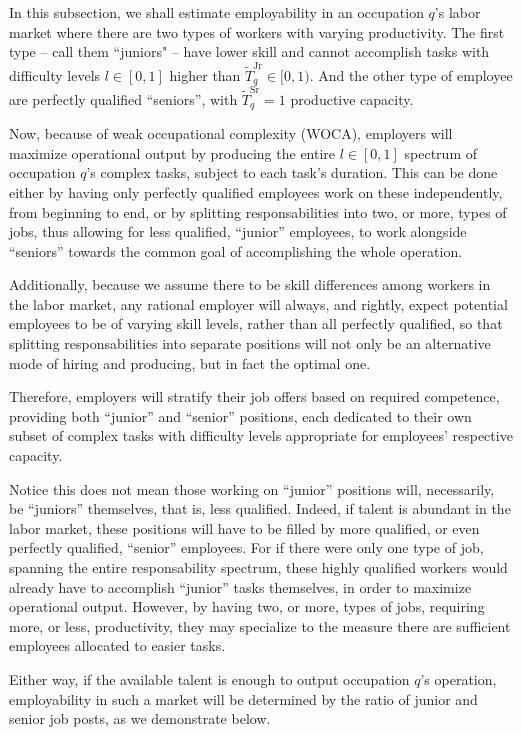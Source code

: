 \documentclass[hidelinks, nonatbib]{elsarticle}
\begin{document}
In this subsection, we shall estimate employability in an occupation $q$'s labor market where there are two types of workers with varying productivity. The first type -- call them ``juniors" -- have lower skill and cannot accomplish tasks with difficulty levels $l \in [0,1]$ higher than $\tilde{T}_{q}^{\text{Jr}} \in [0,1)$. And the other type of employee are perfectly qualified ``seniors'', with $\tilde{T}_{q}^{\text{Sr}} = 1$ productive capacity.

Now, because of weak occupational complexity (WOCA), employers will maximize operational output by producing the entire $l \in [0,1]$ spectrum of occupation $q$'s complex tasks, subject to each task's duration. This can be done either by having only perfectly qualified employees work on these independently, from beginning to end, or by splitting responsabilities into two, or more, types of jobs, thus allowing for less qualified, ``junior'' employees, to work alongside ``seniors'' towards the common goal of accomplishing the whole operation.

Additionally, because we assume there to be skill differences among workers in the labor market, any rational employer will always, and rightly, expect potential employees to be of varying skill levels, rather than all perfectly qualified, so that splitting responsabilities into separate positions will not only be an alternative mode of hiring and producing, but in fact the optimal one.

Therefore, employers will stratify their job offers based on required competence, providing both ``junior'' and ``senior'' positions, each dedicated to their own subset of complex tasks with difficulty levels appropriate for employees' respective capacity.

Notice this does not mean those working on ``junior'' positions will, necessarily, be ``juniors'' themselves, that is, less qualified. Indeed, if talent is abundant in the labor market, these positions will have to be filled by more qualified, or even perfectly qualified, ``senior'' employees. For if there were only one type of job, spanning the entire responsability spectrum, these highly qualified workers would already have to accomplish ``junior'' tasks themselves, in order to maximize operational output. However, by having two, or more, types of jobs, requiring more, or less, productivity, they may specialize to the measure there are sufficient employees allocated to easier tasks.

Either way, if the available talent is enough to output occupation $q$'s operation, employability in such a market will be determined by the ratio of junior and senior job posts, as we demonstrate below.
\end{document}
